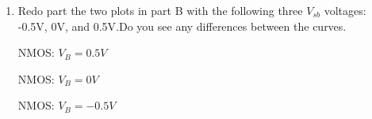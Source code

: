 \documentclass{article}
\begin{document}
\begin{enumerate}
\begin{center}
    \end{center}
    \newpage
    \item Redo part the two plots in part B with the following three $V_{sb}$ voltages: -0.5V, 0V, and 0.5V.Do you see any differences between the curves.
    \begin{center}
        
        NMOS: $V_B = 0.5V$
    \end{center}
    \begin{center}
        
        NMOS: $V_B = 0V$
    \end{center}
    \begin{center}
        
        NMOS: $V_B = -0.5V$
    \end{center}
    \begin{center}
        

\end{center}
\end{enumerate}
\end{document}
